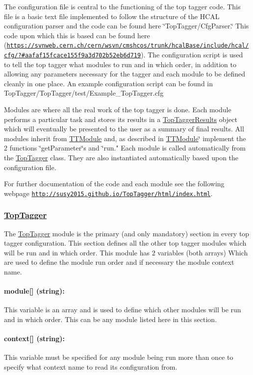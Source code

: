 The configuration file is central to the functioning of the top tagger code. This file is a basic text file implemented to follow the structure of the H\-C\-A\-L configuration parser and the code can be found here \char`\"{}\-Top\-Tagger/\-Cfg\-Parser.\char`\"{} This code upon which this is based can be found here (\href{https://svnweb.cern.ch/cern/wsvn/cmshcos/trunk/hcalBase/include/hcal/cfg/?#aafaf15fcace155f9a3d702b52eb6d719}{\tt https\-://svnweb.\-cern.\-ch/cern/wsvn/cmshcos/trunk/hcal\-Base/include/hcal/cfg/?\#aafaf15fcace155f9a3d702b52eb6d719}). The configuration script is used to tell the top tagger what modules to run and in which order, in addition to allowing any parameters necessary for the tagger and each module to be defined cleanly in one place. An example configuration script can be found in Top\-Tagger/\-Top\-Tagger/test/\-Example\-\_\-\-Top\-Tagger.\-cfg

Modules are where all the real work of the top tagger is done. Each module performs a particular task and stores its results in a \hyperlink{classTopTaggerResults}{Top\-Tagger\-Results} object which will eventually be presented to the user as a summary of final results. All modules inherit from \hyperlink{classTTModule}{T\-T\-Module} and, as described in \hyperlink{classTTModule}{T\-T\-Module}\char`\"{} implement the 2 functions \char`\"{}get\-Parameter\char`\"{}s and \char`\"{}run." Each module is called automatically from the \hyperlink{classTopTagger}{Top\-Tagger} class. They are also instantiated automatically based upon the configuration file.

For further documentation of the code and each module see the following webpage \href{http://susy2015.github.io/TopTagger/html/index.html}{\tt http\-://susy2015.\-github.\-io/\-Top\-Tagger/html/index.\-html}.

\subsubsection*{\hyperlink{classTopTagger}{Top\-Tagger}}

The \hyperlink{classTopTagger}{Top\-Tagger} module is the primary (and only mandatory) section in every top tagger configuration. This section defines all the other top tagger modules which will be run and in which order. This module has 2 variables (both arrays) Which are used to define the module run order and if necessary the module context name.

\paragraph*{module\mbox{[}\mbox{]} (string)\-:}

This variable is an array and is used to define which other modules will be run and in which order. This can be any module listed here in this section.

\paragraph*{context\mbox{[}\mbox{]} (string)\-:}

This variable must be specified for any module being run more than once to specify what context name to read its configuration from. 